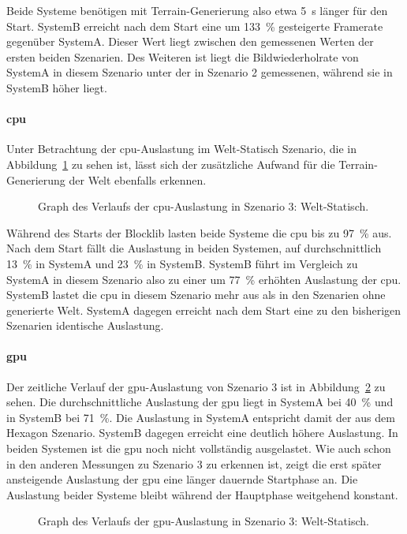 Beide Systeme benötigen mit Terrain-Generierung also etwa \SI{5}{\second} länger für den Start. SystemB erreicht nach dem Start eine um \SI{133}{\percent} gesteigerte Framerate gegenüber SystemA. Dieser Wert liegt zwischen den gemessenen Werten der ersten beiden Szenarien. Des Weiteren ist liegt die Bildwiederholrate von SystemA in diesem Szenario unter der in Szenario 2 gemessenen, während sie in SystemB höher liegt.

\paragraph{\ac{cpu}}
Unter Betrachtung der \ac{cpu}-Auslastung im Welt-Statisch Szenario, die in Abbildung~\ref{fig:seed-0-static-cpu} zu sehen ist, lässt sich der zusätzliche Aufwand für die Terrain-Generierung der Welt ebenfalls erkennen.
\begin{figure}[!htbp]
	\caption[Graph des Verlaufs der -Auslastung in Szenario 3: Welt-Statisch.]{Graph des Verlaufs der \ac{cpu}-Auslastung in Szenario 3: Welt-Statisch.}\label{fig:seed-0-static-cpu}
\end{figure}
Während des Starts der Blocklib lasten beide Systeme die \ac{cpu} bis zu \SI{97}{\percent} aus. Nach dem Start fällt die Auslastung in beiden Systemen, auf durchschnittlich \SI{13}{\percent} in SystemA und \SI{23}{\percent} in SystemB.
SystemB führt im Vergleich zu SystemA in diesem Szenario also zu einer um \SI{77}{\percent} erhöhten Auslastung der \ac{cpu}. SystemB lastet die \ac{cpu} in diesem Szenario mehr aus als in den Szenarien ohne generierte Welt. SystemA dagegen erreicht nach dem Start eine zu den bisherigen Szenarien identische Auslastung.

\paragraph{\ac{gpu}}
Der zeitliche Verlauf der \ac{gpu}-Auslastung von Szenario 3 ist in Abbildung~\ref{fig:seed-0-static-gpu} zu sehen. Die durchschnittliche Auslastung der \ac{gpu} liegt in SystemA bei \SI{40}{\percent} und in SystemB bei \SI{71}{\percent}. Die Auslastung in SystemA entspricht damit der aus dem Hexagon Szenario. SystemB dagegen erreicht eine deutlich höhere Auslastung. In beiden Systemen ist die \ac{gpu} noch nicht vollständig ausgelastet. Wie auch schon in den anderen Messungen zu Szenario 3 zu erkennen ist, zeigt die erst später ansteigende Auslastung der \ac{gpu} eine länger dauernde Startphase an. Die Auslastung beider Systeme bleibt während der Hauptphase weitgehend konstant.
\begin{figure}[!htbp]
	\caption[Graph des Verlaufs der -Auslastung in Szenario 3: Welt-Statisch.]{Graph des Verlaufs der \ac{gpu}-Auslastung in Szenario 3: Welt-Statisch.}\label{fig:seed-0-static-gpu}
\end{figure}

